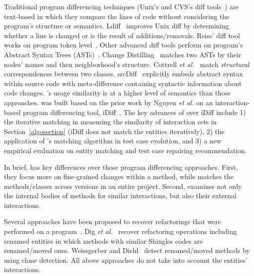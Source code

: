 Traditional program differencing techniques (Unix's and CVS's diff
tools~\cite{Tichy1984}) are text-based in which they compare the lines
of code without considering the program's structure or semantics.
Ldiff~\cite{ldiff09} improves Unix diff by determining whether a line
is changed or is the result of additions/removals. 
Reiss' diff tool works on program token level~\cite{Reiss08}.
Other advanced diff tools perform on program's Abstract Syntax Trees
(ASTs)~\cite{Fluri07,Neamtiu05,Cottrell07}.
Change Distilling~\cite{Fluri07} matches two ASTs by their nodes'
names and then neighborhood's structure.  Cottrell {\em et
al.}~\cite{Cottrell07} match {\em structural} correspondences between
two classes.
srcDiff~\cite{maletic04} explicitly embeds abstract syntax within
source code with meta-difference containing syntactic information
about code changes.  {\tool}'s usage similarity is at a higher level
of semantics than those approaches.
%
{\tool} was built based on the prior work by Nguyen {\em et al.} on an
interaction-based program differencing tool,
iDiff~\cite{ase11-tool}. The key advances of {\tool} over iDiff
include 
1) the iterative matching in measuring the similarity of interaction
sets in Section~\ref{algosection} (iDiff does not match the entities
iteratively), 2) the application of {\tool}'s matching algorithm in
test case evolution, and 3) a new empirical evaluation on entity
matching and test case repairing recommendation.

In brief, {\tool} has key differences over those program
differencing approaches. First, they focus more on fine-grained
changes within a method, while {\tool} matches the methods/classes
across versions in an entire project.  Second, {\tool} examines not
only the internal bodies of methods for similar interactions, but also
their external interactions. 


\vspace{0.05in}
  Several approaches have been
proposed to recover refactorings that were performed on a
program~\cite{Weissgerber06,Dig06,
Malpohl00,Antoniol04,Demeyer00,Xing07:diffcatchup}.
%
Dig {\em et al.}~\cite{Dig06} recover refactoring operations including
renamed entities in which methods with similar Shingles codes are
renamed/moved ones. 
Weissgerber and Diehl~\cite{Weissgerber06} detect renamed/moved
methods by using clone detection.
All above approaches do not take into account the entities'
interactions.






